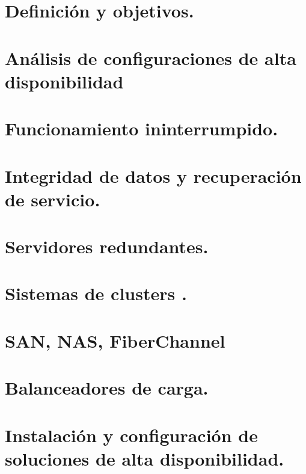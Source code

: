 \documentclass[letterpaper,10pt,spanish]{sphinxmanual}
\begin{document}
\section{Definición y objetivos.}
\label{\detokenize{tema_sad/tema_sad:definicion-y-objetivos}}

\section{Análisis de configuraciones de alta disponibilidad}
\label{\detokenize{tema_sad/tema_sad:analisis-de-configuraciones-de-alta-disponibilidad}}

\section{Funcionamiento ininterrumpido.}
\label{\detokenize{tema_sad/tema_sad:funcionamiento-ininterrumpido}}

\section{Integridad de datos y recuperación de servicio.}
\label{\detokenize{tema_sad/tema_sad:integridad-de-datos-y-recuperacion-de-servicio}}

\section{Servidores redundantes.}
\label{\detokenize{tema_sad/tema_sad:servidores-redundantes}}

\section{Sistemas de  clusters .}
\label{\detokenize{tema_sad/tema_sad:sistemas-de-clusters}}

\section{SAN, NAS, FiberChannel}
\label{\detokenize{tema_sad/tema_sad:san-nas-fiberchannel}}

\section{Balanceadores de carga.}
\label{\detokenize{tema_sad/tema_sad:balanceadores-de-carga}}

\section{Instalación y configuración de soluciones de alta disponibilidad.}
\label{\detokenize{tema_sad/tema_sad:instalacion-y-configuracion-de-soluciones-de-alta-disponibilidad}}
\end{document}
